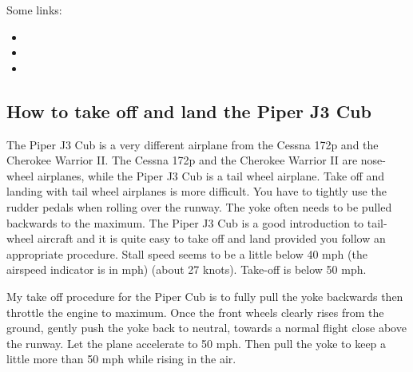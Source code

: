 Some links:
\begin{itemize}
	\item {}
        \item {}
        \item {}
\end{itemize}
    
    
    \subsection{How to take off and land the Piper J3 Cub}
    \label{sec:PiperJ3}

The Piper J3 Cub is a very different airplane from the Cessna 172p and the 
Cherokee Warrior II. The Cessna 172p and the Cherokee Warrior II are nose-wheel
airplanes, while the Piper J3 Cub is a tail wheel airplane. Take off and landing 
with tail wheel airplanes is more difficult. You have to tightly use the rudder 
pedals when rolling over the runway. The yoke often needs to be pulled backwards 
to the maximum. The Piper J3 Cub is a good introduction to tail-wheel aircraft
and it is quite easy to take off and land provided you follow an appropriate 
procedure. Stall speed seems to be a little below 40 mph (the airspeed 
indicator is in mph) (about 27 knots). Take-off is below 50 mph.

My take off procedure for the Piper Cub is to fully pull the yoke
backwards then throttle the engine to maximum. Once the front wheels
clearly rises from the ground, gently push the yoke back to neutral,
towards a normal flight close above the runway. Let the plane
accelerate to 50 mph. Then pull the yoke to keep a little more than 50
mph while rising in the air.

